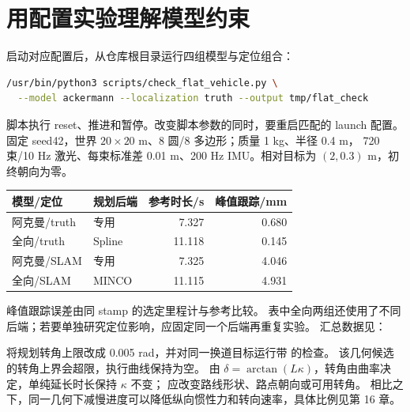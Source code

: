 \section{用配置实验理解模型约束}
启动对应配置后，从仓库根目录运行四组模型与定位组合：
\begin{lstlisting}[language=bash,numbers=none]
/usr/bin/python3 scripts/check_flat_vehicle.py \
  --model ackermann --localization truth --output tmp/flat_check
\end{lstlisting}
脚本执行 reset、推进和暂停。改变脚本参数的同时，要重启匹配的 launch 配置。
固定 seed42，世界 $20\times20$ m、8 圆/8 多边形；质量 1 kg、半径 0.4 m，
720 束/10 Hz 激光、每束标准差 0.01 m、200 Hz IMU。相对目标为 $(2,0.3)$ m，初终朝向为零。
\begin{center}\small
\begin{tabular}{llrr}\toprule
模型/定位 & 规划后端 & 参考时长/s & 峰值跟踪/mm\\\midrule
阿克曼/truth & 专用 & 7.327 & 0.680\\
全向/truth & Spline & 11.118 & 0.145\\
阿克曼/SLAM & 专用 & 7.325 & 4.046\\
全向/SLAM & MINCO & 11.115 & 4.931\\\bottomrule
\end{tabular}
\end{center}
峰值跟踪误差由同 stamp 的选定里程计与参考比较。
表中全向两组还使用了不同后端；若要单独研究定位影响，应固定同一个后端再重复实验。
汇总数据见：
\begin{center}\end{center}

将规划转角上限改成 0.005 rad，并对同一换道目标运行带  的检查。
该几何候选的转角上界会超限，执行曲线保持为空。
由 $\delta=\arctan(L\kappa)$，转角由曲率决定，单纯延长时长保持 $\kappa$ 不变；
应改变路线形状、路点朝向或可用转角。
相比之下，同一几何下减慢进度可以降低纵向惯性力和转向速率，具体比例见第 16 章。

